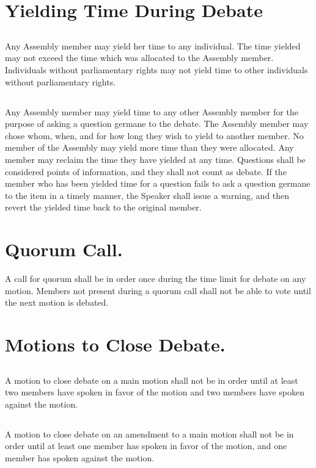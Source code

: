 \documentclass{rules}
\begin{document}
\section{Yielding Time During Debate}
\subsection{}
Any Assembly member may yield her time to any individual.  The time yielded may not exceed the time which was allocated to the Assembly member. Individuals without parliamentary rights may not yield time to other individuals without parliamentary rights.
\subsection{}
Any Assembly member may yield time to any other Assembly member for the purpose of asking a question germane to the debate.  The Assembly member may chose whom, when, and for how long they wish to yield to another member.  No member of the Assembly may yield more time than they were allocated.  Any member may reclaim the time they have yielded at any time.  Questions shall be considered points of information, and they shall not count as debate.  If the member who has been yielded time for a question fails to ask a question germane to the item in a timely manner, the Speaker shall issue a warning, and then revert the yielded time back to the original member.
\section{Quorum Call.}
A call for quorum shall be in order once during the time limit for debate on any motion.  Members not present during a quorum call shall not be able to vote until the next motion is debated.
\section{Motions to Close Debate.}
\subsection{}
A motion to close debate on a main motion shall not be in order until at least two members have spoken in favor of the motion and two members have spoken against the motion.  
\subsection{}
A motion to close debate on an amendment to a main motion shall not be in order until at least one member has spoken in favor of the motion, and one member has spoken against the motion.
\end{document}
